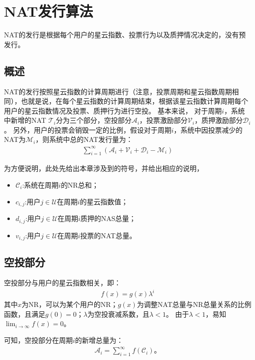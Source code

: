 
\section{NAT发行算法}

NAT的发行是根据每个用户的星云指数、投票行为以及质押情况决定的，没有预发行。

\subsection{概述}
NAT的发行按照星云指数的计算周期进行（注意，投票周期和星云指数周期相同），也就是说，在每个星云指数的计算周期结束，根据该星云指数计算周期每个用户的星云指数情况及投票、质押行为进行空投。
基本来说，
对于周期$i$，系统中新增的NAT $\mathcal{T}_i$分为三个部分，空投部分$\mathcal{A}_i$，投票激励部分$\mathcal{V}_i$，质押激励部分$\mathcal{D}_i$。
另外，用户的投票会销毁一定的比例，假设对于周期$i$，系统中因投票减少的NAT为$\mathcal{M}_i$，则系统中总的NAT发行量为：
\begin{align}
\sum_{i=1}^{\infty} (\mathcal{A}_i + \mathcal{V}_i + \mathcal{D}_i - \mathcal{M}_i)
\end{align}

为方便说明，此处先给出本章涉及到的符号，并给出相应的说明，
\begin{itemize}
\item $\mathcal{C}_i$:系统在周期$i$的NR总和；
\item $c_{i,j}$:用户$j \in \mathcal{U}$在周期$i$的星云指数值；
\item $d_{i,j}$:用户$j \in \mathcal{U}$在周期$i$质押的NAS总量；
\item $v_{i,j}$:用户$j \in \mathcal{U}$在周期$i$投票的NAT总量。
\end{itemize}

\subsection{空投部分}
空投部分与用户的星云指数相关，即：
\begin{align}
    f(x) = g(x)\lambda^i
\end{align}
\noindent 其中$x$为NR，可以为某个用户的NR；$g(x)$为调整NAT总量与NR总量关系的比例函数，且满足$g(0) = 0$；$\lambda$为空投衰减系数，且$\lambda < 1$。
由于$\lambda < 1$，易知$\lim_{i\to \infty}f(x) = 0$。

可知，空投部分在周期$i$的新增总量为：
\begin{align}
\mathcal{A}_i = \sum_{i=1}^{\infty}f(\mathcal{C}_i)。
\end{align}

